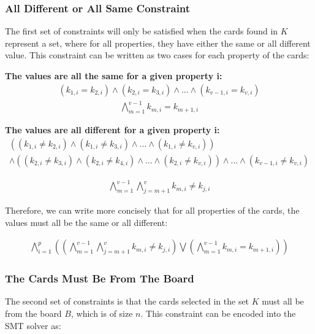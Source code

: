 \documentclass[pageno]{jpaper}
\begin{document}
\subsubsection{All Different or All Same Constraint} The first set of constraints will only be satisfied when the cards found in $K$ represent a set, where for all properties, they have either the same or all different value. This constraint can be written as two cases for each property of the cards:

\textbf{The values are all the same for a given property i:} 
\begin{align}
	(k_{1,i} = k_{2,i}) \wedge (k_{2,i} = k_{3,i}) \wedge ... \wedge (k_{v-1,i} = k_{v,i})
\end{align}
\begin{align}
	\bigwedge \limits_{m=1}^{v-1} k_{m,i} = k_{m+1,i}
\end{align}

\textbf{The values are all different for a given property i:}
\begin{multline}
	((k_{1,i} \neq k_{2,i}) \wedge (k_{1,i} \neq k_{3,i}) \wedge ... \wedge (k_{1,i} \neq k_{v,i})) \\
	 \wedge ((k_{2,i} \neq k_{3,i}) \wedge (k_{2,i} \neq k_{4,i}) \wedge ... \wedge (k_{2,i} \neq k_{v,i})) \wedge 
	 ... \wedge (k_{v-1,i} \neq k_{v,i})
\end{multline}

\begin{align}
	\bigwedge \limits_{m=1}^{v-1}  \bigwedge \limits_{j = m+1}^{v} k_{m,i} \neq k_{j,i}
\end{align}


Therefore, we can write more concisely that for all properties of the cards, the values must all be the same or all different:

\begin{align}
	\bigwedge \limits_{i=1}^{p}  \left(  \left( \bigwedge \limits_{m=1}^{v-1}  \bigwedge \limits_{j = m+1}^{v} k_{m,i} \neq k_{j,i} \right)  \bigvee  	 \left(  \bigwedge \limits_{m=1}^{v-1} k_{m,i} = k_{m+1,i} \right) \right)
\end{align}


\subsubsection{The Cards Must Be From The Board}

The second set of constraints is that the cards selected in the set $K$ must all be from the board $B$, which is of size $n$. This constraint can be encoded into the SMT solver as:
\end{document}
